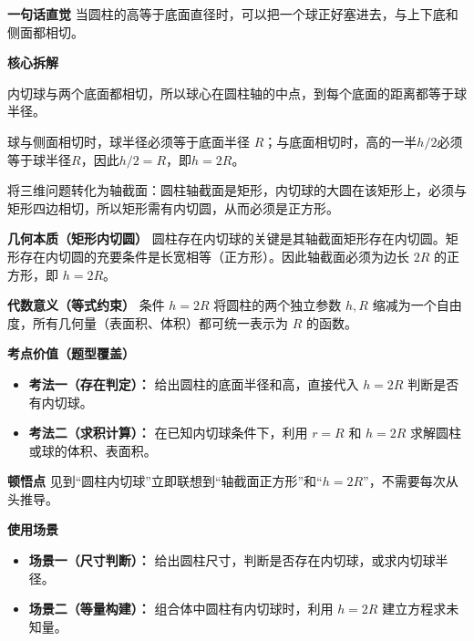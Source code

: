 \begin{explanationbox}
	\textbf{\textcolor{CExplanation}{一句话直觉}}
	当圆柱的高等于底面直径时，可以把一个球正好塞进去，与上下底和侧面都相切。

	\medskip
	\textbf{\textcolor{CExplanation}{核心拆解}}
	\begin{description}[style=nextline, leftmargin=2.8em, labelsep=0.5em, itemsep=0.45em]
		\item[\textbf{要点一（球心定位）：}]
			内切球与两个底面都相切，所以球心在圆柱轴的中点，到每个底面的距离都等于球半径。
		\item[\textbf{要点二（半径条件）：}]
			球与侧面相切时，球半径必须等于底面半径 $R$；与底面相切时，高的一半$h/2$必须等于球半径$R$，因此$h/2=R$，即$h=2R$。
		\item[\textbf{要点三（截面转化）：}]
			将三维问题转化为轴截面：圆柱轴截面是矩形，内切球的大圆在该矩形上，必须与矩形四边相切，所以矩形需有内切圆，从而必须是正方形。
	\end{description}

	\medskip
	\textbf{\textcolor{CExplanation}{几何本质（矩形内切圆）}}
	圆柱存在内切球的关键是其轴截面矩形存在内切圆。矩形存在内切圆的充要条件是长宽相等（正方形）。因此轴截面必须为边长 $2R$ 的正方形，即 $h=2R$。

	\medskip
	\textbf{\textcolor{CExplanation}{代数意义（等式约束）}}
	条件 $h=2R$ 将圆柱的两个独立参数 $h,R$ 缩减为一个自由度，所有几何量（表面积、体积）都可统一表示为 $R$ 的函数。

	\medskip
	\textbf{\textcolor{CExplanation}{考点价值（题型覆盖）}}
	\begin{itemize}[leftmargin=*, itemsep=0.5em, topsep=0.4em]
		\item \textbf{考法一（存在判定）：} 给出圆柱的底面半径和高，直接代入 $h=2R$ 判断是否有内切球。
		\item \textbf{考法二（求积计算）：} 在已知内切球条件下，利用 $r=R$ 和 $h=2R$ 求解圆柱或球的体积、表面积。
	\end{itemize}

	\medskip
	\textbf{\textcolor{CExplanation}{顿悟点}}
	见到“圆柱内切球”立即联想到“轴截面正方形”和“$h=2R$”，不需要每次从头推导。

	\medskip
	\textbf{\textcolor{CExplanation}{使用场景}}
	\begin{itemize}[leftmargin=*, itemsep=0.5em, topsep=0.4em]
		\item \textbf{场景一（尺寸判断）：} 给出圆柱尺寸，判断是否存在内切球，或求内切球半径。
		\item \textbf{场景二（等量构建）：} 组合体中圆柱有内切球时，利用 $h=2R$ 建立方程求未知量。
	\end{itemize}

\end{explanationbox}
